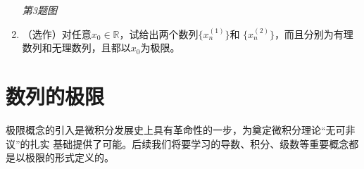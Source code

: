 \begin{ext}
\begin{enumerate}
\begin{center}
		
		\it \small 第3题图
	\end{center}
	\item （选作）对任意$x_0\in\mathbb{R}$，试给出两个数列$\{x^{(1)}_n\}$和
	$\{x^{(2)}_n\}$，而且分别为有理数列和无理数列，且都以$x_0$为极限。
	\end{enumerate}
\end{ext}

\section{数列的极限}

极限概念的引入是微积分发展史上具有革命性的一步，为奠定微积分理论“无可非议”的扎实
基础提供了可能。后续我们将要学习的导数、积分、级数等重要概念都是以极限的形式定义的。

